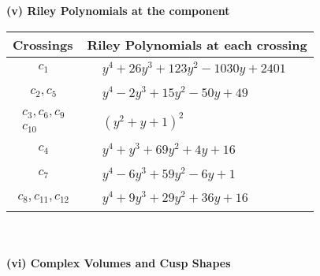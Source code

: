\documentclass[1p]{elsarticle_modified}
\theoremstyle{definition}
\begin{document}
\newpage\renewcommand{\arraystretch}{1}
\flushleft \textbf{(v) Riley Polynomials at the component}\newline \\
\begin{tabular}{m{50pt}|m{274pt}}
Crossings & \hspace{64pt}Riley Polynomials at each crossing \\
\hline $$\begin{aligned}c_{1}\end{aligned}$$&$\begin{aligned}
&y^4+26 y^3+123 y^2-1030 y+2401
\end{aligned}$\\
\hline $$\begin{aligned}c_{2},c_{5}\end{aligned}$$&$\begin{aligned}
&y^4-2 y^3+15 y^2-50 y+49
\end{aligned}$\\
\hline $$\begin{aligned}c_{3},c_{6},c_{9}\\c_{10}\end{aligned}$$&$\begin{aligned}
&(y^2+y+1)^2
\end{aligned}$\\
\hline $$\begin{aligned}c_{4}\end{aligned}$$&$\begin{aligned}
&y^4+y^3+69 y^2+4 y+16
\end{aligned}$\\
\hline $$\begin{aligned}c_{7}\end{aligned}$$&$\begin{aligned}
&y^4-6 y^3+59 y^2-6 y+1
\end{aligned}$\\
\hline $$\begin{aligned}c_{8},c_{11},c_{12}\end{aligned}$$&$\begin{aligned}
&y^4+9 y^3+29 y^2+36 y+16
\end{aligned}$\\
\hline
\end{tabular}\\~\\
\newpage\flushleft \textbf{(vi) Complex Volumes and Cusp Shapes}
\end{document}

